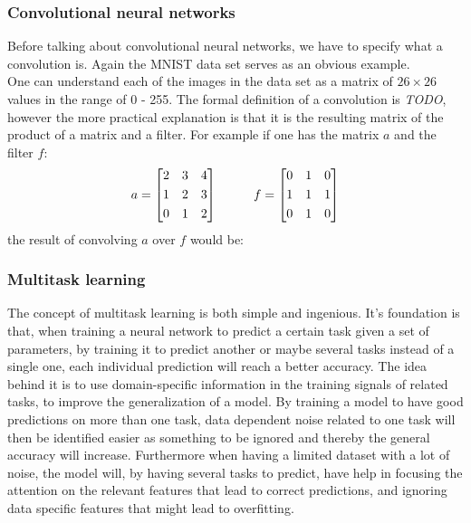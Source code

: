 \subsubsection{Convolutional neural networks}
Before talking about convolutional neural networks, we have to specify what a convolution is. Again the MNIST data set serves as an obvious example.\\
One can understand each of the images in the data set as a matrix of $26\times26$ values in the range of 0 - 255. The formal definition of a convolution is \emph{TODO}, however the more practical explanation is that it is the resulting matrix of the product of a matrix and a filter. For example if one has the matrix $a$ and the filter $f$:
\[
a = \begin{bmatrix}
       2 & 3 & 4           \\[0.3em]
       1 & 2 & 3 \\[0.3em]
       0 & 1 & 2
     \end{bmatrix}
\hspace*{1cm}
f = \begin{bmatrix}
       0 & 1 & 0           \\[0.3em]
       1 & 1 & 1 \\[0.3em]
       0 & 1 & 0
     \end{bmatrix}     
\]
the result of convolving $a$ over $f$ would be:
\subsubsection{Multitask learning}

The concept of multitask learning is both simple and ingenious. It's foundation is that, when training a neural network to predict a certain task given a set of parameters, by training it to predict another or maybe several tasks instead of a single one, each individual prediction will reach a better accuracy. The idea behind it is to use domain-specific information in the training signals of related tasks, to improve the generalization of a model. By training a model to have good predictions on more than one task, data dependent noise related to one task will then be identified easier as something to be ignored and thereby the general accuracy will increase. Furthermore when having a limited dataset with a lot of noise, the model will, by having several tasks to predict, have help in focusing the attention on the relevant features that lead to correct predictions, and ignoring data specific features that might lead to overfitting. 

